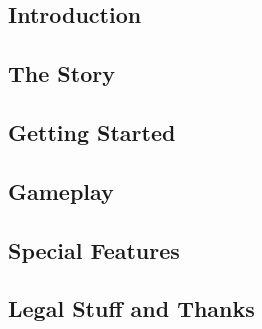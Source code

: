   

  \subsection{Introduction}
    
  \subsection{The Story}
    
  \subsection{Getting Started}
    
  \subsection{Gameplay}
     
  \subsection{Special Features}
    
  \subsection{Legal Stuff and Thanks}
    

  \hyperref[ugref]{}
    

